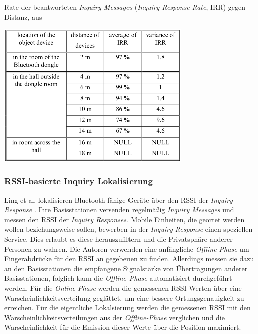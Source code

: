 \begin{table}[h]
  \centering
  \caption{Rate der beantworteten \emph{Inquiry Messages} (\emph{Inquiry Response Rate}, IRR) gegen Distanz, aus \cite{bargh2008indoor}}
	\includegraphics[width=0.7\textwidth]{images/irr.png}

  \label{table:irr}
\end{table}

\subsubsection{RSSI-basierte Inquiry Lokalisierung}
\label{ch:Vorherige:sec:inq}
Ling et al. lokalisieren Bluetooth-fähige Geräte über den RSSI der \emph{Inquiry Response} \cite{ling2010inquiry}.
Ihre Basisstationen versenden regelmäßig \emph{Inquiry Messages} und messen den RSSI der \emph{Inquiry Responses}.
Mobile Einheiten, die geortet werden wollen beziehungsweise sollen, bewerben in der \emph{Inquiry Response} einen speziellen Service.
Dies erlaubt es diese herauszufiltern und die Privatsphäre anderer Personen zu wahren.
Die Autoren verwenden eine anfängliche \emph{Offline-Phase} um Fingerabdrücke für den RSSI an gegebenen zu finden.
Allerdings messen sie dazu an den Basisstationen die empfangene Signalstärke von Übertragungen anderer Basisstationen, folglich kann die \emph{Offline-Phase} automatisiert durchgeführt werden.
Für die \emph{Online-Phase} werden die gemessenen RSSI Werten über eine Warscheinlichkeitsverteilung geglättet, um eine bessere Ortungsgenauigkeit zu erreichen.
Für die eigentliche Lokalsierung werden die gemessenen RSSI mit den Warscheinlichkeitsverteilungen aus der \emph{Offline-Phase} verglichen und die Warscheinlichkeit für die Emission dieser Werte über die Position maximiert.

